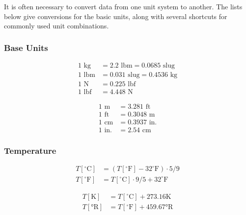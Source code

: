It is often necessary to convert data from one unit system to another.  The lists below give conversions for the basic units, along with several shortcuts for commonly used unit combinations.

\begin{multicols}{2}
\subsubsection{Base Units}
\begin{align*}
1 \text{ kg} & = 2.2 \text{ lbm} = 0.0685 \text{ slug} \\
1 \text{ lbm} & = 0.031 \text{ slug} = 0.4536 \text{ kg} \\
1 \text{ N} & = 0.225 \text{ lbf} \\
1 \text{ lbf} &= 4.448 \text{ N} 
\end{align*}

\begin{align*}
1 \text{ m} & = 3.281 \text{ ft} \\
1 \text{ ft} &= 0.3048 \text{ m} \\
1 \text{ cm} &= 0.3937 \text{ in.} \\
1 \text{ in.} &= 2.54 \text{ cm}
\end{align*}

\end{multicols}

\begin{multicols}{2}
\subsubsection{Temperature}
\begin{align*}
T[^{\circ}\text{C}] &= (T[^{\circ}\text{F}]-32^{\circ}\text{F})\cdot 5/9 \\
T[^{\circ}\text{F}] &= T[^{\circ}\text{C}]\cdot 9/5+32^{\circ}\text{F}
\end{align*}

\begin{align*}
T[\text{K}] &= T[^{\circ}\text{C}] + 273.16 \text{K}\\
T[\text{°R}] &= T[^{\circ}\text{F}] + 459.67 \text{°R}
\end{align*}
\end{multicols}

